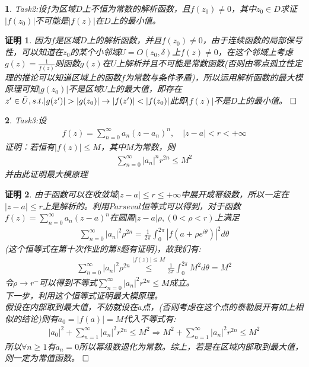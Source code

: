\documentclass{ctexart}
\newcommand{\。}{．} %
\newenvironment{lanse}{
    \begin{tcolorbox}[breakable,enhanced, colback=qlan, boxrule=0pt, frame hidden,
        borderline west={0.7mm}{0.1mm}{slan}]
    }
    {\end{tcolorbox}}
\newenvironment{zise}{
    \begin{tcolorbox}[breakable,enhanced, colback=qzi, boxrule=0pt, frame hidden,
        borderline west={0.7mm}{0.1mm}{szi}]
    }
    {\end{tcolorbox}}
\theoremstyle{t} %
\newtheorem*{zmhj}{\color{slan} 证明}
\newtheorem*{smhj}{\color{slan} }
\newenvironment{zm}{\begin{lanse}\begin{zmhj}}{$\hfill \square$\end{zmhj}\end{lanse}}
\newenvironment{sm}{\begin{zise}\begin{smhj}}{\end{smhj}\end{zise}}
\begin{document}
\begin{sm}
    Task2:设$f$为区域$D$上不恒为常数的解析函数，且$f(z_0)\neq 0$，其中$z_0\in D$求证$|f(z_0)|$不可能是$|f(z)|$在$D$上的最小值。
\end{sm}
\begin{zm}
    因为$f$是区域$D$上的解析函数，并且$f(z_0)\neq 0$，由于连续函数的局部保号性，可以知道在$z_0$的某个小邻域$U=O(z_0,\delta)$上$f(z)\neq 0$，在这个邻域上考虑$g(z)=\frac{1}{f(z)}$则函数$g(z)$在$U$上解析并且不可能是常数函数(否则由零点孤立性定理的推论可以知道区域上的函数$f$为常数与条件矛盾)，所以运用解析函数的最大模原理可知$|g(z_0)|$不是区域$U$上的最大值，即存在$z'\in \bar{U},\space s.t.\space |g(z')|>|g(z_0)|\rightarrow |f(z')|<|f(z_0)|$此即$|f(z)|$不是$D$上的最小值。
\end{zm}
\begin{sm}
    Task3:设\begin{align*}
        f(z)=\sum_{n=0}^{\infty}a_n(z-a_n)^n,\quad |z-a|<r<+\infty
    \end{align*}
    证明：若恒有$|f(z)|\le M$，其中$M$为常数，则\begin{align*}
        \sum_{n=0}^{\infty}|a_n|^nr^{2n}\le M^2
    \end{align*}并由此证明最大模原理
\end{sm}
\begin{zm}
    由于函数可以在收敛域$|z-a|\le r\le +\infty$中展开成幂级数，所以一定在$|z-a|\le r$上是解析的。利用$Parseval$恒等式可以得到，对于函数$f(z)=\sum_{n=0}^{\infty}a_n(z-a)^n$在圆周$|z-a|\rho,(0<\rho<r)$上满足\begin{align*}
        \sum_{n=0}^{\infty}|a_n|^2\rho^{2n}=\frac{1}{2\pi}\int_{0}^{2\pi}|f(a+\rho e^{i\theta})|^2d\theta
    \end{align*}(这个恒等式在第十次作业的第8题有证明)，故我们有:
    \begin{align*}
        \sum_{n=0}^{\infty}|a_n|^2\rho^{2n}\overset{|f(z)|\le M}{\le} \frac{1}{2\pi}\int_{0}^{2\pi}M^2d\theta=M^2 
    \end{align*}
    令$\rho\to r^-$可以得到不等式$\sum_{n=0}^{\infty}|a_n|^2r^{2n}\le M$成立。\\
    下一步，利用这个恒等式证明最大模原理。\\
    假设在内部取到最大值，不妨就设在$a$点，(否则考虑在这个点的泰勒展开有如上相似的结论)则有$a_0=|f(a)|=M$代入不等式有:
    \begin{align*}
        |a_0|^2+\sum_{n=1}^{\infty}|a_n|^2r^{2n}\le M^2\Rightarrow M^2+\sum_{n=1}^{\infty}|a_n|^2r^{2n}\le M^2
    \end{align*}
    所以$\forall n\ge 1$有$a_n=0$所以幂级数退化为常数。综上，若是在区域内部取到最大值，则一定为常值函数。
\end{zm}
\end{document}
